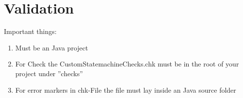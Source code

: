 %
\section{Validation}
Important things:
\begin{enumerate}
\item Must be an Java project
\item For Check the CustomStatemachineChecks.chk must be in the root of your
project under ''checks'' 
\item For error markers in chk-File the file must lay
inside an Java source folder
\end{enumerate}
